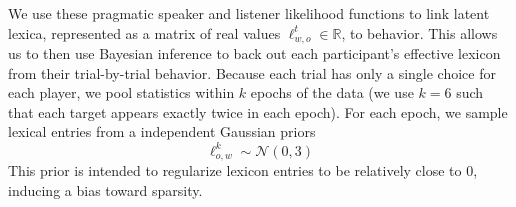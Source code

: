 \documentclass[10pt,letterpaper]{article}
\newcommand{\ndg}[1]{\textcolor{Green}{[ndg: #1]}}
\begin{document}
We use these pragmatic speaker and listener likelihood functions to link latent lexica, represented as a matrix of real values $\ell_{w,o}^t \in \mathbb{R}$, to behavior.
%
This allows us to then use Bayesian inference to back out each participant's effective lexicon from their trial-by-trial behavior.
Because each trial has only a single choice for each player, we pool statistics within $k$ epochs of the data (we use $k=6$ such that each target appears exactly twice in each epoch). 
For each epoch, we sample lexical entries from a independent Gaussian priors $$\ell_{o,w}^k\sim\mathcal{N}(0, 3)$$ This prior is intended to regularize lexicon entries to be relatively close to 0, inducing a bias toward sparsity. %
\end{document}
